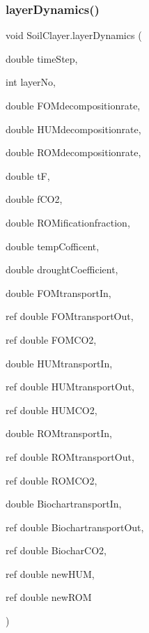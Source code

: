 \subsubsection{\texorpdfstring{layerDynamics()}{layerDynamics()}}
{\footnotesize\ttfamily void Soil\+Clayer.\+layer\+Dynamics (\begin{DoxyParamCaption}\item[{double}]{time\+Step,  }\item[{int}]{layer\+No,  }\item[{double}]{F\+O\+Mdecompositionrate,  }\item[{double}]{H\+U\+Mdecompositionrate,  }\item[{double}]{R\+O\+Mdecompositionrate,  }\item[{double}]{tF,  }\item[{double}]{f\+C\+O2,  }\item[{double}]{R\+O\+Mificationfraction,  }\item[{double}]{temp\+Cofficent,  }\item[{double}]{drought\+Coefficient,  }\item[{double}]{F\+O\+Mtransport\+In,  }\item[{ref double}]{F\+O\+Mtransport\+Out,  }\item[{ref double}]{F\+O\+M\+C\+O2,  }\item[{double}]{H\+U\+Mtransport\+In,  }\item[{ref double}]{H\+U\+Mtransport\+Out,  }\item[{ref double}]{H\+U\+M\+C\+O2,  }\item[{double}]{R\+O\+Mtransport\+In,  }\item[{ref double}]{R\+O\+Mtransport\+Out,  }\item[{ref double}]{R\+O\+M\+C\+O2,  }\item[{double}]{Biochartransport\+In,  }\item[{ref double}]{Biochartransport\+Out,  }\item[{ref double}]{Biochar\+C\+O2,  }\item[{ref double}]{new\+H\+UM,  }\item[{ref double}]{new\+R\+OM }\end{DoxyParamCaption})\hspace{0.3cm}{\ttfamily [inline]}}

\mbox{\label{class_soil_clayer_aee7a8dc76945ac6f4797517bfe51c10e}} 
